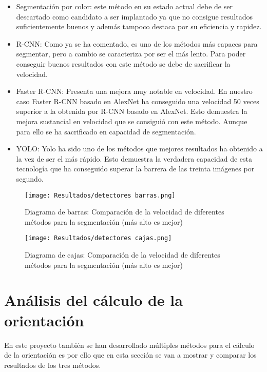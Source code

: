 \begin{itemize}
\item Segmentación por color: este método en su estado actual debe de ser descartado como candidato a ser implantado ya que no consigue resultados suficientemente buenos y además tampoco destaca por su eficiencia y rapidez.
\item R-CNN: Como ya se ha comentado, es uno de los métodos más capaces para segmentar, pero a cambio se caracteriza por ser el más lento. Para poder conseguir buenos resultados con este método se debe de sacrificar la velocidad.
\item Faster R-CNN: Presenta una mejora muy notable en velocidad. En nuestro caso Faster R-CNN basado en AlexNet ha conseguido una velocidad 50 veces superior a la obtenida por R-CNN basado en AlexNet. Esto demuestra la mejora sustancial en velocidad que se consiguió con este método. Aunque para ello se ha sacrificado en capacidad de segmentación.
\item YOLO: Yolo ha sido uno de los métodos que mejores resultados ha obtenido a la vez de ser el más rápido. Esto demuestra la verdadera capacidad de esta tecnología que ha conseguido superar la barrera de las treinta imágenes por segundo.
\end{itemize}

\begin{figure}[ht]  %
	\centering
	\texttt{[image: Resultados/detectores barras.png]}
	\caption{Diagrama de barras: Comparación de la velocidad de diferentes métodos para la segmentación (más alto es mejor)}
	\label{fig:velocidad barras}
\end{figure}

\begin{figure}[ht]  %
	\centering
	\texttt{[image: Resultados/detectores cajas.png]}
	\caption{Diagrama de cajas: Comparación de la velocidad de diferentes métodos para la segmentación (más alto es mejor)}
	\label{fig:velocidad cajas}
\end{figure}

\newpage
\section{Análisis del cálculo de la orientación}
En este proyecto también se han desarrollado múltiples métodos para el cálculo de la orientación es por ello que en esta sección se van a mostrar y comparar los resultados de los tres métodos.

